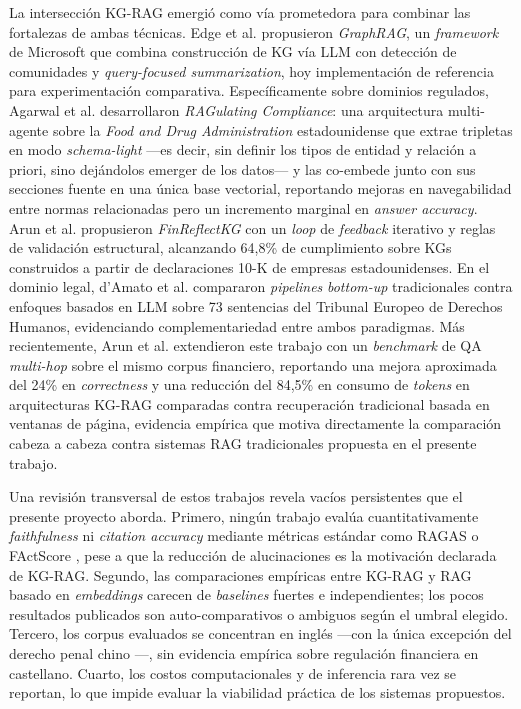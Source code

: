 \documentclass[12pt,a4paper]{article}
\begin{document}
La intersección KG-RAG emergió como vía prometedora para combinar las fortalezas de ambas técnicas. Edge et al. \cite{edge2024graphrag} propusieron \textit{GraphRAG}, un \textit{framework} de Microsoft que combina construcción de KG vía LLM con detección de comunidades y \textit{query-focused summarization}, hoy implementación de referencia para experimentación comparativa. Específicamente sobre dominios regulados, Agarwal et al. \cite{agarwal2025ragulating} desarrollaron \textit{RAGulating Compliance}: una arquitectura multi-agente sobre la \textit{Food and Drug Administration} estadounidense que extrae tripletas en modo \textit{schema-light} —es decir, sin definir los tipos de entidad y relación a priori, sino dejándolos emerger de los datos— y las co-embede junto con sus secciones fuente en una única base vectorial, reportando mejoras en navegabilidad entre normas relacionadas pero un incremento marginal en \textit{answer accuracy}. Arun et al. \cite{arun2025finreflect} propusieron \textit{FinReflectKG} con un \textit{loop} de \textit{feedback} iterativo y reglas de validación estructural, alcanzando 64{,}8\% de cumplimiento sobre KGs construidos a partir de declaraciones 10-K de empresas estadounidenses. En el dominio legal, d'Amato et al. \cite{damato2025legalkg} compararon \textit{pipelines} \textit{bottom-up} tradicionales contra enfoques basados en LLM sobre 73 sentencias del Tribunal Europeo de Derechos Humanos, evidenciando complementariedad entre ambos paradigmas. Más recientemente, Arun et al. \cite{arun2025finreflectmultihop} extendieron este trabajo con un \textit{benchmark} de QA \textit{multi-hop} sobre el mismo corpus financiero, reportando una mejora aproximada del 24\% en \textit{correctness} y una reducción del 84{,}5\% en consumo de \textit{tokens} en arquitecturas KG-RAG comparadas contra recuperación tradicional basada en ventanas de página, evidencia empírica que motiva directamente la comparación cabeza a cabeza contra sistemas RAG tradicionales propuesta en el presente trabajo.
 
Una revisión transversal de estos trabajos revela vacíos persistentes que el presente proyecto aborda. Primero, ningún trabajo evalúa cuantitativamente \textit{faithfulness} ni \textit{citation accuracy} mediante métricas estándar como RAGAS \cite{es2024ragas} o FActScore \cite{min2023factscore}, pese a que la reducción de alucinaciones es la motivación declarada de KG-RAG. Segundo, las comparaciones empíricas entre KG-RAG y RAG basado en \textit{embeddings} carecen de \textit{baselines} fuertes e independientes; los pocos resultados publicados son auto-comparativos o ambiguos según el umbral elegido. Tercero, los corpus evaluados se concentran en inglés —con la única excepción del derecho penal chino \cite{li2024jkem}—, sin evidencia empírica sobre regulación financiera en castellano. Cuarto, los costos computacionales y de inferencia rara vez se reportan, lo que impide evaluar la viabilidad práctica de los sistemas propuestos.
\end{document}
